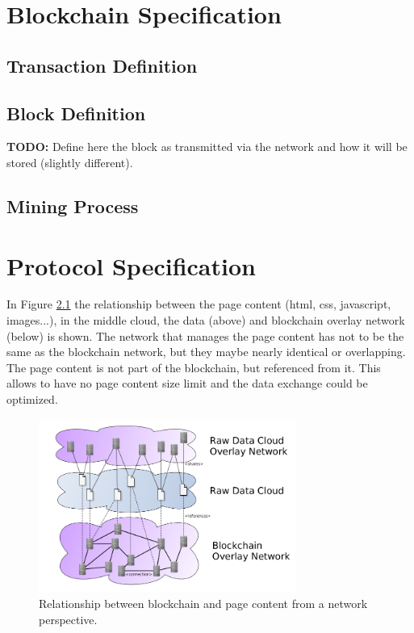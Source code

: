 \documentclass[12pt,fleqn]{book} %
\begin{document}

\chapter{Blockchain Specification}

\section{Transaction Definition}


\section{Block Definition}
\textbf{TODO:} Define here the block as transmitted via the network and how it
will be stored (slightly different).

\section{Mining Process}


\chapter{Protocol Specification}

In Figure \ref{fig:data_cloud_blockchain} the relationship between the page
content (html, css, javascript, images...), in the middle cloud, the data
(above) and blockchain overlay network (below) is shown. The network that
manages the page content has not to be the same as the blockchain network, but
they maybe nearly identical or overlapping. The page content is not part of
the blockchain, but referenced from it. This allows to have no page content
size limit and the data exchange could be optimized.

\begin{figure}[htp]
\centering
\includegraphics[width=0.75\textwidth]{pictures/data_cloud_blockchain.png}
\caption{Relationship between blockchain and page content from a network
perspective.}
\label{fig:data_cloud_blockchain}
\end{figure}
\end{document}
